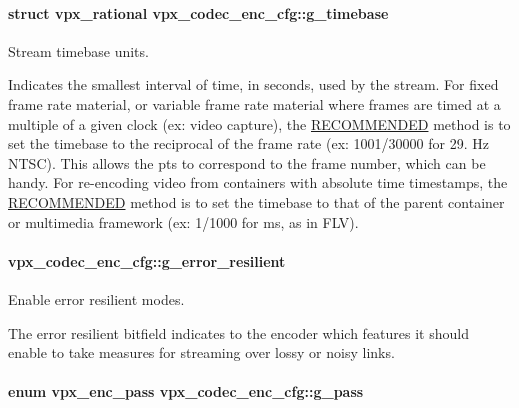 \paragraph[{\texorpdfstring{g\+\_\+timebase}{g_timebase}}]{\setlength{\rightskip}{0pt plus 5cm}struct {\bf vpx\+\_\+rational} vpx\+\_\+codec\+\_\+enc\+\_\+cfg\+::g\+\_\+timebase}\hypertarget{structvpx__codec__enc__cfg_a6498d378e4c29ef3e22258289e481087}{}\label{structvpx__codec__enc__cfg_a6498d378e4c29ef3e22258289e481087}


Stream timebase units. 

Indicates the smallest interval of time, in seconds, used by the stream. For fixed frame rate material, or variable frame rate material where frames are timed at a multiple of a given clock (ex\+: video capture), the \hyperlink{rfc2119_RECOMMENDED}{R\+E\+C\+O\+M\+M\+E\+N\+D\+ED} method is to set the timebase to the reciprocal of the frame rate (ex\+: 1001/30000 for 29. Hz N\+T\+SC). This allows the pts to correspond to the frame number, which can be handy. For re-\/encoding video from containers with absolute time timestamps, the \hyperlink{rfc2119_RECOMMENDED}{R\+E\+C\+O\+M\+M\+E\+N\+D\+ED} method is to set the timebase to that of the parent container or multimedia framework (ex\+: 1/1000 for ms, as in F\+LV). 
\paragraph[{\texorpdfstring{g\+\_\+error\+\_\+resilient}{g_error_resilient}}]{ vpx\+\_\+codec\+\_\+enc\+\_\+cfg\+::g\+\_\+error\+\_\+resilient}\hypertarget{structvpx__codec__enc__cfg_a4e17173b66ca0d7dfba9978625d7ba76}{}\label{structvpx__codec__enc__cfg_a4e17173b66ca0d7dfba9978625d7ba76}


Enable error resilient modes. 

The error resilient bitfield indicates to the encoder which features it should enable to take measures for streaming over lossy or noisy links. 
\paragraph[{\texorpdfstring{g\+\_\+pass}{g_pass}}]{\setlength{\rightskip}{0pt plus 5cm}enum {\bf vpx\+\_\+enc\+\_\+pass} vpx\+\_\+codec\+\_\+enc\+\_\+cfg\+::g\+\_\+pass}\hypertarget{structvpx__codec__enc__cfg_a70d62d87aae7d1168746577f14a6dccf}{}\label{structvpx__codec__enc__cfg_a70d62d87aae7d1168746577f14a6dccf}


